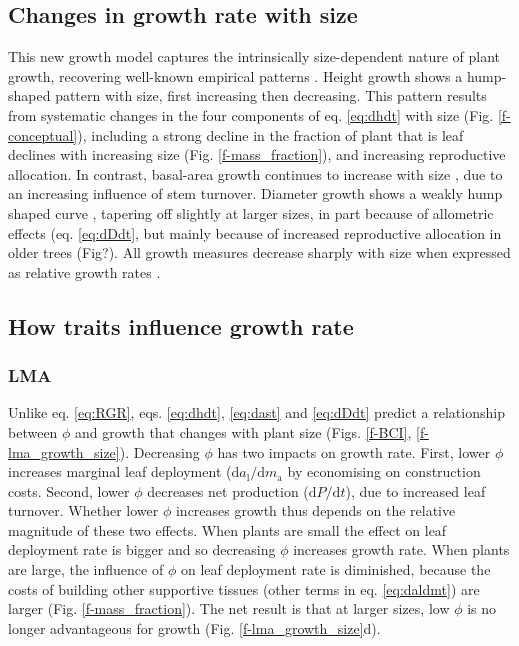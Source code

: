 \documentclass[12pt, a4paper]{article}
\begin{document}
\subsection{Changes in growth rate with size}

This new growth model captures the intrinsically size-dependent nature
of plant growth, recovering well-known
empirical patterns \citep{sillett-2010, king-2011}. Height growth shows a hump-shaped pattern
with size, first increasing then decreasing. This pattern results from
systematic changes in the four components of eq. \ref{eq:dhdt} with size
(Fig. \ref{f-conceptual}), including a strong decline in the fraction of plant
that is leaf declines with increasing size (Fig. \ref{f-mass_fraction}),
and increasing reproductive allocation. In contrast, basal-area growth
continues to increase with size \citep{sillett-2010, stephenson-2014},
due to an increasing influence of stem
turnover. Diameter growth shows a weakly hump shaped
curve \citep{herault-2011}, tapering off slightly at larger
sizes, in part because of allometric effects (eq. \ref{eq:dDdt}, but
mainly because of increased reproductive allocation in older trees
(Fig?). All growth measures decrease sharply with size when expressed as
relative growth rates \citep{iida-2014}.


\subsection{How traits influence growth rate}

\subsubsection{LMA}

Unlike eq. \ref{eq:RGR}, eqs. \ref{eq:dhdt}, \ref{eq:dast} and
\ref{eq:dDdt} predict a relationship between $\phi$ and growth that
changes with plant size (Figs. \ref{f-BCI}, \ref{f-lma_growth_size}).
Decreasing $\phi$ has two impacts on growth rate. First, lower
$\phi$ increases marginal leaf deployment
($\textrm{d}a_\textrm{l} / \textrm{d}m_\textrm{a}$ by economising on
construction costs. Second, lower $\phi$ decreases net production
($\textrm{d}P / \textrm{d}t$), due to increased leaf turnover. Whether
lower $\phi$ increases growth thus depends on the relative magnitude
of these two effects. When plants are small the effect on leaf
deployment rate is bigger and so decreasing $\phi$ increases growth
rate. When plants are large, the influence of $\phi$ on leaf
deployment rate is diminished, because the costs of building other
supportive tissues (other terms in eq. \ref{eq:daldmt}) are larger (Fig.
\ref{f-mass_fraction}). The net result is that at larger sizes, low
$\phi$ is no longer advantageous for growth (Fig.
\ref{f-lma_growth_size}d).
\end{document}

